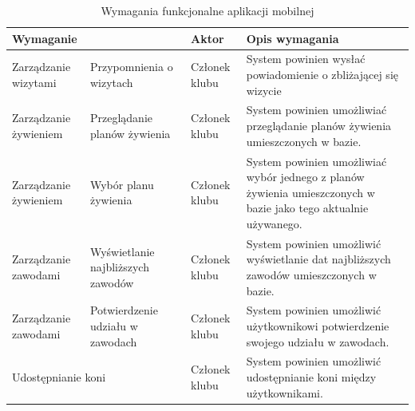 \documentclass[12pt,oneside]{report}
\begin{document}
\begin{table}[h!]
	\centering
	\begin{tabular}{|p{3cm}|p{3cm}|p{4cm}|p{6cm}|}			
		\hline
		\multicolumn{2}{|l|}{Wymaganie} & Aktor & Opis wymagania\\
		\hline
		Zarządzanie wizytami & Przypomnienia o wizytach& Członek klubu & System powinien wysłać powiadomienie o zbliżającej się wizycie\\
		\hline
		Zarządzanie żywieniem & Przeglądanie planów żywienia & Członek klubu & System powinien umożliwiać przeglądanie planów żywienia umieszczonych w bazie.\\
		\hline
		Zarządzanie żywieniem & Wybór planu żywienia & Członek klubu & System powinien umożliwiać wybór jednego z planów żywienia umieszczonych w bazie jako tego aktualnie używanego.\\
		\hline
		Zarządzanie zawodami & Wyświetlanie najbliższych zawodów & Członek klubu & System powinien umożliwić wyświetlanie dat najbliższych zawodów umieszczonych w bazie.\\
		\hline
		Zarządzanie zawodami & Potwierdzenie udziału w zawodach & Członek klubu & System powinien umożliwić użytkownikowi potwierdzenie swojego udziału w zawodach.\\
		\hline
		\multicolumn{2}{|l|}{Udostępnianie koni}&Członek klubu& System powinien umożliwić udostępnianie koni między użytkownikami.\\
		\hline
	\end{tabular}
	\caption{Wymagania funkcjonalne aplikacji mobilnej}
	\label{funkcjonalneMobilki2}
\end{table}
\end{document}
